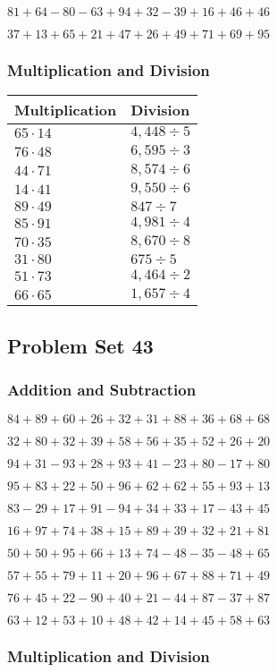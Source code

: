 \(81+64-80-63+94+32-39+16+46+46\)

\(37+13+65+21+47+26+49+71+69+95\)

\hypertarget{multiplication-and-division-82}{%
\subsubsection{Multiplication and
Division}\label{multiplication-and-division-82}}

\begin{longtable}[]{@{}ll@{}}
\toprule
Multiplication & Division\tabularnewline
\midrule
\endhead
\(65\cdot14\) & \(4,448÷5\)\tabularnewline
\(76\cdot48\) & \(6,595÷3\)\tabularnewline
\(44\cdot71\) & \(8,574÷6\)\tabularnewline
\(14\cdot41\) & \(9,550÷6\)\tabularnewline
\(89\cdot49\) & \(847÷7\)\tabularnewline
\(85\cdot91\) & \(4,981÷4\)\tabularnewline
\(70\cdot35\) & \(8,670÷8\)\tabularnewline
\(31\cdot80\) & \(675÷5\)\tabularnewline
\(51\cdot73\) & \(4,464÷2\)\tabularnewline
\(66\cdot65\) & \(1,657÷4\)\tabularnewline
\bottomrule
\end{longtable}

\hypertarget{problem-set-43}{%
\subsection{Problem Set 43}\label{problem-set-43}}

\hypertarget{addition-and-subtraction-83}{%
\subsubsection{Addition and
Subtraction}\label{addition-and-subtraction-83}}

\(84+89+60+26+32+31+88+36+68+ 68\)

\(32+80+32+39+58+56+35+52+26+20\)

\(94+31-93+28+93+41-23+80-17+80\)

\(95+83+22+50+96+62+62+55+93+13\)

\(83-29+17+91-94+34+33+17-43+45\)

\(16+97+74+38+15+89+39+32+21+81\)

\(50+50+95+66+13+74-48-35-48+65\)

\(57+55+79+11+20+96+67+88+71+49\)

\(76+45+22-90+40+21-44+87-37+87\)

\(63+12+53+10+48+42+14+45+58+63\)

\hypertarget{multiplication-and-division-83}{%
\subsubsection{Multiplication and
Division}\label{multiplication-and-division-83}}

